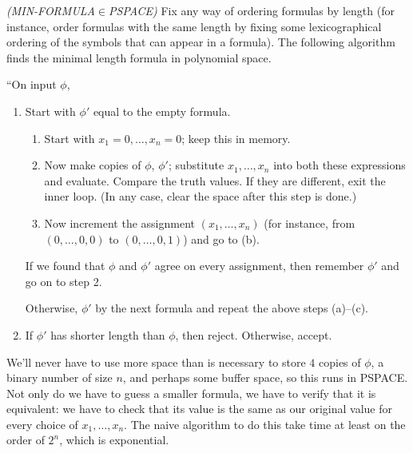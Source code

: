 \begin{problem}{\it(MIN-FORMULA$\in$PSPACE)}
Fix any way of ordering formulas by length (for instance, order formulas with the same length by fixing some lexicographical ordering of the symbols that can appear in a formula). The following algorithm finds the minimal length formula in polynomial space.

``On input $\phi$,
\begin{enumerate}
\item
Start with $\phi'$ equal to the empty formula.
\begin{enumerate}
\item
Start with $x_1=0,\ldots, x_n=0$; keep this in memory.
\item
Now make copies of $\phi$, $\phi'$; substitute $x_1,\ldots, x_n$ into both these expressions and evaluate. Compare the truth values. If they are different, exit the inner loop. (In any case, clear the space after this step is done.)
\item
Now increment the assignment $(x_1,\ldots, x_n)$ (for instance, from $(0,\ldots, 0,0)$ to $(0,\ldots, 0,1)$) and go to (b).
\end{enumerate}
If we found that $\phi$ and $\phi'$ agree on every assignment, then remember $\phi'$ and go on to step 2.

Otherwise, $\phi'$ by the next formula and repeat the above steps (a)--(c).
\item
If $\phi'$ has shorter length than $\phi$, then reject. Otherwise, accept.
\end{enumerate}
We'll never have to use more space than is necessary to store $4$ copies of $\phi$, a binary number of size $n$, and perhaps some buffer space, so this runs in PSPACE.\\

Not only do we have to guess a smaller formula, we have to verify that it is equivalent: we have to check that its value is the same as our original value for every choice of $x_1,\ldots, x_n$. The naive algorithm to do this take time at least on the order of $2^n$, which is exponential.
\end{problem}

\pagebreak

